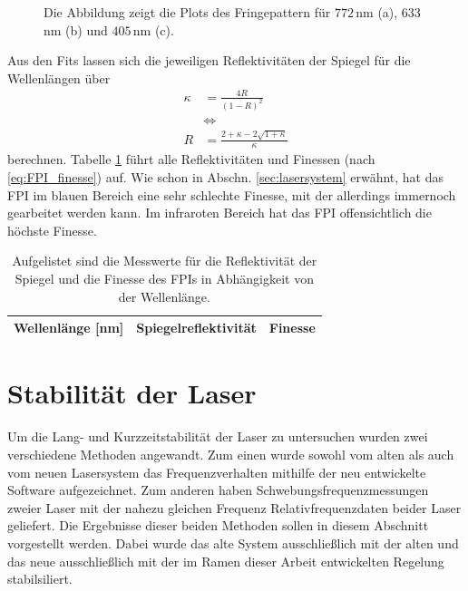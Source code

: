 \begin{figure}[hp]
 	\centering
 	\footnotesize
 	\fbox{\parbox{\dimexpr \linewidth - 2\fboxrule - 2\fboxsep}{
 	\subfigure[]{
		\label{subfig:finesse_messung_a}
		
		}
 	\subfigure[]{
		\label{subfig:finesse_messung_b}
		
		}
	 \subfigure[]{
		\label{subfig:finesse_messung_c}
		
		}
	}}
	\caption[Finesse des FPIs]{Die Abbildung zeigt die Plots des
 	Fringepattern für $772\,$nm (a), $633\,$nm (b) und $405\,$nm (c).}
	\label{fig:finesse_messung}
\end{figure}
Aus den Fits lassen sich die jeweiligen Reflektivitäten der Spiegel für die
Wellenlängen über
\begin{equation}\label{eq:finesse_messung_02}
	\begin{split}
		\kappa&=\frac{4R}{(1-R)^2}\\
		&\Leftrightarrow\\
		R&=\frac{2+\kappa-2\sqrt{1+\kappa}}{\kappa}
	\end{split}	
\end{equation}
berechnen. Tabelle \ref{tab:finesse} führt alle Reflektivitäten und Finessen
(nach \ref{eq:FPI_finesse}) auf. Wie schon in Abschn. \ref{sec:lasersystem}
erwähnt, hat das FPI im blauen Bereich eine sehr schlechte Finesse, mit der
allerdings immernoch gearbeitet werden kann. Im infraroten Bereich hat das FPI
offensichtlich die höchste Finesse.
\begin{table}[h]
	\begin{tabular}{ccc}
		\toprule
		\multicolumn{1}{C{0.30\textwidth}}{Wellenlänge [nm]} &
		\multicolumn{1}{C{0.31\textwidth}}{Spiegelreflektivität} &
		\multicolumn{1}{C{0.30\textwidth}}{Finesse}\\
		\midrule[1px]
		\hline
		
		\bottomrule[1px]
	\end{tabular}
	\caption[FPI Finesse]{Aufgelistet sind die Messwerte für die Reflektivität der
	Spiegel und die Finesse des FPIs in Abhängigkeit von der Wellenlänge.}
	\label{tab:finesse}
\end{table}

\section{Stabilität der Laser}\label{sec:stabilitaet_der_laser}
Um die Lang- und Kurzzeitstabilität der Laser zu untersuchen wurden zwei
verschiedene Methoden angewandt. Zum einen wurde sowohl vom alten als auch vom
neuen Lasersystem das Frequenzverhalten mithilfe der neu entwickelte Software
aufgezeichnet. Zum anderen haben Schwebungsfrequenzmessungen zweier Laser mit
der nahezu gleichen Frequenz Relativfrequenzdaten beider Laser geliefert. Die
Ergebnisse dieser beiden Methoden sollen in diesem Abschnitt vorgestellt werden.
Dabei wurde das alte System ausschließlich mit der alten und das neue
ausschließlich mit der im Ramen dieser Arbeit entwickelten Regelung
stabilsiliert.

